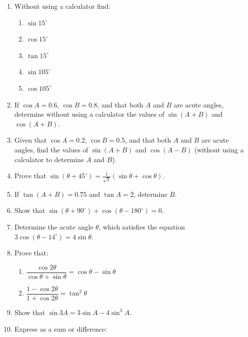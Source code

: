 \documentclass[
  english,
  12pt,
  oneside]{book}
\providecommand{\tightlist}{%
  \setlength{\itemsep}{0pt}\setlength{\parskip}{0pt}}
\theoremstyle{definition}
\theoremstyle{definition}
\theoremstyle{definition}
\theoremstyle{definition}
\theoremstyle{remark}
\begin{document}
\begin{enumerate}
\def\labelenumi{\arabic{enumi}.}
\item
  Without using a calculator find:

  \begin{enumerate}
  \def\labelenumii{\roman{enumii})}
  \tightlist
  \item
    \(\sin 15^\circ\)
  \item
    \(\cos 15^\circ\)
  \item
    \(\tan 15^\circ\)
  \item
    \(\sin 105^\circ\)
  \item
    \(\cos 105^\circ\)
  \end{enumerate}
\item
  If \(\cos A = 0.6\), \(\cos B = 0.8\), and that both \(A\) and \(B\) are acute angles, determine without using a calculator the values of \(\sin (A + B)\) and \(\cos(A + B)\).
\item
  Given that \(\cos A = 0.2\), \(\cos B = 0.5\), and that both \(A\) and \(B\) are acute angles, find the values of
  \(\sin (A + B)\) and \(\cos (A - B)\) (without using a calculator to determine \(A\) and \(B\)).
\item
  Prove that \(\sin(\theta+45^\circ)=\frac{1}{\sqrt{2}}(\sin\theta+\cos\theta)\).
\item
  If \(\tan(A+B)=0.75\) and \(\tan A=2\), determine \(B\).
\item
  Show that \(\sin (\theta + 90^\circ) + \cos (\theta - 180^\circ) = 0\).
\item
  Determine the acute angle \(\theta\), which satisfies the equation \(3 \cos (\theta - 14^\circ) = 4 \sin \theta\).
\item
  Prove that:

  \begin{enumerate}
  \def\labelenumii{\roman{enumii})}
  \tightlist
  \item
    \(\dfrac{\cos2\theta}{\cos\theta+\sin\theta}=\cos\theta-\sin\theta\)
  \item
    \(\dfrac{1-\cos2\theta}{1+\cos2\theta}=\tan^2\theta\)
  \end{enumerate}
\item
  Show that \(\sin 3A = 3\sin A - 4\sin^3 A\).
\item
  Express as a sum or difference:


\end{enumerate}
\end{document}
